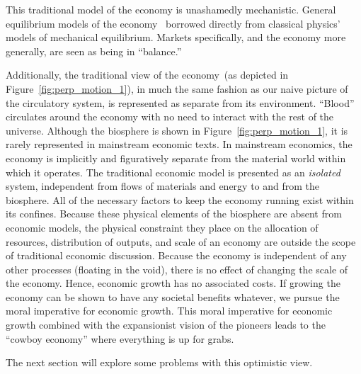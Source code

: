 This traditional model of the economy is unashamedly mechanistic.
General equilibrium models of the economy~\cite{Walras1892, Walras1993}
borrowed directly from classical physics' models of 
mechanical equilibrium.\cite{Ingrao1990}
Markets specifically,
and the economy more generally,
are seen as being in ``balance.''

Additionally,
the traditional view of the economy~(as
depicted in Figure~\ref{fig:perp_motion_1}),
in much the same fashion as our naive picture of
the circulatory system,
is represented as separate from its environment.
``Blood'' circulates around the economy
with no need to interact with the rest of the universe.
Although the biosphere is shown in
Figure~\ref{fig:perp_motion_1}, 
it is rarely represented in mainstream economic texts. 
In mainstream economics, 
the economy is implicitly and figuratively separate from 
the material world within which it operates.
The traditional economic model is presented as 
an \emph{isolated} system, 
independent from flows of materials and energy 
to and from the biosphere.
All of the necessary factors to keep the economy
running exist within its confines.
Because these physical elements of the biosphere are absent from economic models,
the physical constraint they place on the allocation of resources, distribution of outputs, and 
scale of an economy are outside the scope of traditional economic discussion.
Because the economy is independent of any other processes
(floating in the void),
there is no effect of changing the scale of the economy.
Hence, economic growth has no associated costs.
If growing the economy can be shown to have any
societal benefits whatever,
we pursue the moral imperative for economic growth.
This moral imperative for economic growth 
combined with the expansionist vision of the pioneers
leads to the ``cowboy economy''
where everything is up for grabs.\cite{Boulding1966}

The next section will explore some problems with this
optimistic view.


